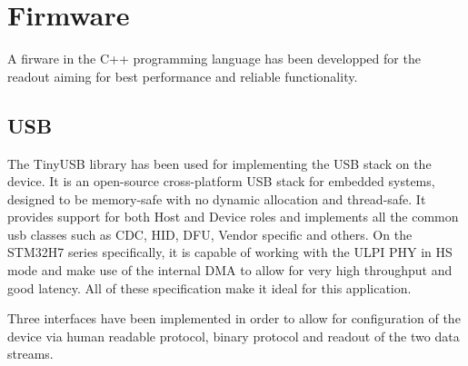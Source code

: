 \chapter{Firmware}
A firware in the C++ programming language has been developped for the readout aiming for best performance and reliable functionality. 
\section{USB}
The TinyUSB library has been used for implementing the USB stack on the device. It is an open-source cross-platform USB stack for embedded systems, designed to be memory-safe with no dynamic allocation and thread-safe. It provides support for both Host and Device roles and implements all the common usb classes such as CDC, HID, DFU, Vendor specific and others. On the STM32H7 series specifically, it is capable of working with the ULPI PHY in HS mode and make use of the internal DMA to allow for very high throughput and good latency. All of these specification make it ideal for this application.

Three interfaces have been implemented in order to allow for configuration of the device via human readable protocol, binary protocol and readout of the two data streams.
